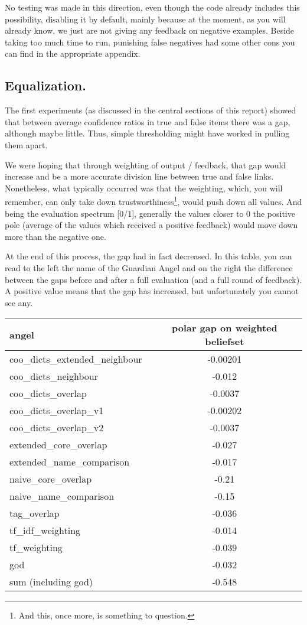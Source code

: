 \documentclass[11pt]{article}
\begin{document}
No testing was made in this direction, even though the code already includes this possibility, disabling it by default, mainly because at the moment, as you will already know, we just are not giving any feedback on negative examples. Beside taking too much time to run, punishing false negatives had some other cons you can find in the appropriate appendix.

\subsection{Equalization.}
The first experiments (as discussed in the central sections of this report) showed that between average confidence ratios in true and false items there was a gap, although maybe little. Thus, simple thresholding might have worked in pulling them apart.

We were hoping that through weighting of output / feedback, that gap would increase and be a more accurate division line between true and false links. Nonetheless, what typically occurred was that the weighting, which, you will remember, can only take down trustworthiness\footnote{And this, once more, is something to question.}, would push down all values. And being the evaluation spectrum [0/1], generally the values closer to 0 the positive pole (average of the values which received a positive feedback) would move down more than the negative one.

At the end of this process, the gap had in fact decreased. In this table, you can read to the left the name of the Guardian Angel and on the right the difference between the gaps before and after a full evaluation (and a full round of feedback). A positive value means that the gap has increased, but unfortunately you cannot see any. 
\vspace{5pt}

\begin{tabular}{l || c }
angel & polar gap on weighted beliefset \\
\hline
coo\_dicts\_extended\_neighbour & -0.00201 \\
 coo\_dicts\_neighbour &-0.012\\
 coo\_dicts\_overlap & -0.0037\\
 coo\_dicts\_overlap\_v1 & -0.00202\\
 coo\_dicts\_overlap\_v2& -0.0037\\
 extended\_core\_overlap& -0.027\\
 extended\_name\_comparison& -0.017\\
 naive\_core\_overlap& -0.21\\
 naive\_name\_comparison&  -0.15\\
 tag\_overlap&  -0.036\\
 tf\_idf\_weighting&  -0.014\\
 tf\_weighting&-0.039\\
 \hline
 god &-0.032 \\
\hline
sum (including god) & -0.548
\end{tabular}
\end{document}
